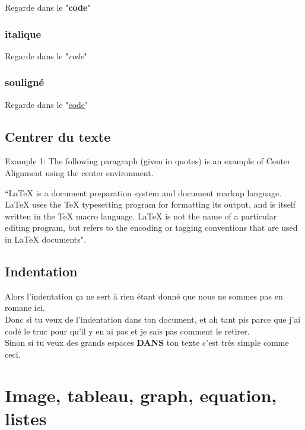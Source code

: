 \documentclass{report}
\begin{document}
Regarde dans le "\textbf{code}"

\subsection{italique}

Regarde dans le "\textit{code}"

\subsection{souligné}

Regarde dans le "\underline{code}"


\section{Centrer du texte}

\begin{center}
Example 1: The following paragraph (given in quotes) is an 
example of Center Alignment using the center environment. 
 
``LaTeX is a document preparation system and document markup 
language. LaTeX uses the TeX typesetting program for formatting 
its output, and is itself written in the TeX macro language. 
LaTeX is not the name of a particular editing program, but 
refers to the encoding or tagging conventions that are used 
in LaTeX documents".
\end{center}

\section{Indentation}

Alors l'indentation ça ne sert à rien étant donné que nous ne sommes pas en romane ici.\\
Donc si tu veux de l'indentation dans ton document, et ah tant pis parce que j'ai codé le truc pour qu'il y en ai pas et je sais pas comment le retirer.\\
Sinon si tu veux des grands espaces \textbf{DANS} ton texte c'est très simple \hspace{1cm} comme \hspace{1cm}ceci.



\chapter{Image, tableau, graph, equation, listes}
\end{document}

